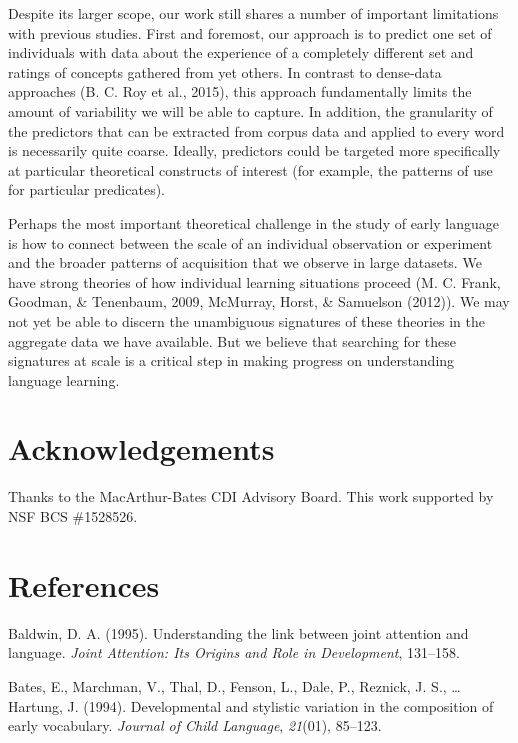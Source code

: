 \documentclass[10pt, letterpaper]{article}
\begin{document}
Despite its larger scope, our work still shares a number of important
limitations with previous studies. First and foremost, our approach is
to predict one set of individuals with data about the experience of a
completely different set and ratings of concepts gathered from yet
others. In contrast to dense-data approaches (B. C. Roy et al., 2015),
this approach fundamentally limits the amount of variability we will be
able to capture. In addition, the granularity of the predictors that can
be extracted from corpus data and applied to every word is necessarily
quite coarse. Ideally, predictors could be targeted more specifically at
particular theoretical constructs of interest (for example, the patterns
of use for particular predicates).

Perhaps the most important theoretical challenge in the study of early
language is how to connect between the scale of an individual
observation or experiment and the broader patterns of acquisition that
we observe in large datasets. We have strong theories of how individual
learning situations proceed (M. C. Frank, Goodman, \& Tenenbaum, 2009,
McMurray, Horst, \& Samuelson (2012)). We may not yet be able to discern
the unambiguous signatures of these theories in the aggregate data we
have available. But we believe that searching for these signatures at
scale is a critical step in making progress on understanding language
learning.

\section{Acknowledgements}\label{acknowledgements}

Thanks to the MacArthur-Bates CDI Advisory Board. This work supported by
NSF BCS \#1528526.

\section{References}\label{references}

\setlength{\parindent}{-0.1in} \setlength{\leftskip}{0.125in} \noindent

Baldwin, D. A. (1995). Understanding the link between joint attention
and language. \emph{Joint Attention: Its Origins and Role in
Development}, 131--158.

Bates, E., Marchman, V., Thal, D., Fenson, L., Dale, P., Reznick, J. S.,
\ldots{} Hartung, J. (1994). Developmental and stylistic variation in
the composition of early vocabulary. \emph{Journal of Child Language},
\emph{21}(01), 85--123.
\end{document}
